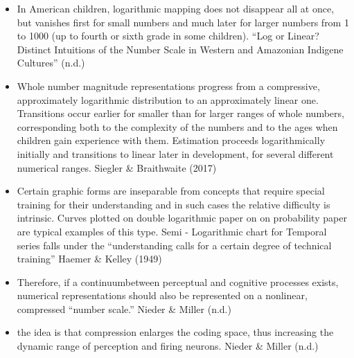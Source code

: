 \documentclass[print]{nuthesis}
\begin{document}
\begin{itemize}
\item
  In American children, logarithmic mapping does not disappear all at once, but vanishes first for small numbers and much later for larger numbers from 1 to 1000 (up to fourth or sixth grade in some children). {``Log or {Linear}? {Distinct} {Intuitions} of the {Number} {Scale} in {Western} and {Amazonian} {Indigene} {Cultures}''} (n.d.)
\item
  Whole number magnitude representations progress from a compressive, approximately logarithmic distribution to an approximately linear one. Transitions occur earlier for smaller than for larger ranges of whole numbers, corresponding both to the complexity of the numbers and to the ages when children gain experience with them. Estimation proceeds logarithmically initially and transitions to linear later in development, for several different numerical ranges. Siegler \& Braithwaite (2017)
\item
  Certain graphic forms are inseparable from concepts that require special training for their understanding and in such cases the relative difficulty is intrinsic. Curves plotted on double logarithmic paper on on probability paper are typical examples of this type. Semi - Logarithmic chart for Temporal series falls under the ``understanding calls for a certain degree of technical training'' Haemer \& Kelley (1949)
\item
  Therefore, if a continuumbetween perceptual and cognitive processes exists, numerical representations should also be represented on a nonlinear, compressed ``number scale.'' Nieder \& Miller (n.d.)
\item
  the idea is that compression enlarges the coding space, thus increasing the dynamic range of perception and firing neurons. Nieder \& Miller (n.d.)
\end{itemize}
\end{document}
